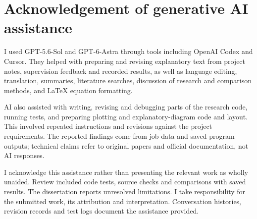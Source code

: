 \chapter{Acknowledgement of generative AI assistance}
I used GPT-5.6-Sol and GPT-6-Astra through tools including OpenAI Codex and Cursor. They helped with preparing and revising explanatory text from project notes, supervision feedback and recorded results, as well as language editing, translation, summaries, literature searches, discussion of research and comparison methods, and \LaTeX{} equation formatting.

AI also assisted with writing, revising and debugging parts of the research code, running tests, and preparing plotting and explanatory-diagram code and layout. This involved repeated instructions and revisions against the project requirements. The reported findings come from job data and saved program outputs; technical claims refer to original papers and official documentation, not AI responses.

I acknowledge this assistance rather than presenting the relevant work as wholly unaided. Review included code tests, source checks and comparisons with saved results. The dissertation reports unresolved limitations. I take responsibility for the submitted work, its attribution and interpretation. Conversation histories, revision records and test logs document the assistance provided.
